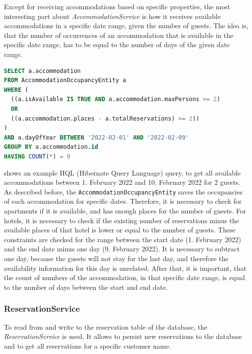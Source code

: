 Except for receiving accommodations based on specific properties, the most interesting part about \textit{AccommodationService} is how it receives available accommodations in a specific date range, given the number of guests.
The idea is, that the number of occurrences of an accommodation that is available in the specific date range, has to be equal to the number of days of the given date range.
\begin{lstlisting}[label=lst:02_design_ejb_accommodation_sql, caption=Example of a HQL query to receive all available accommodations, language=sql]
SELECT a.accommodation
FROM AccommodationOccupancyEntity a
WHERE (
  ((a.isAvailable IS TRUE AND a.accommodation.maxPersons >= 2) 
  OR 
  ((a.accommodation.places - a.totalReservations) >= 2))
)
AND a.dayOfYear BETWEEN '2022-02-01' AND '2022-02-09'
GROUP BY a.accommodation.id
HAVING COUNT(*) = 9 
\end{lstlisting}
 shows an example HQL (Hibernate Query Language) query, to get all available accommodations between 1. February 2022 and 10. February 2022 for 2 guests.
As described before, the \texttt{AccommodationOccupancyEntity} saves the occupancies of each accommodation for specific dates. Therefore, it is necessary to check for apartments if it is available, and has enough places for the number of guests. For hotels, it is necessary to check if the existing number of reservations minus the available places of that hotel is lower or equal to the number of guests.
These constraints are checked for the range between the start date (1. February 2022) and the end date minus one day (9. February 2022). It is necessary to subtract one day, because the guests will not stay for the last day, and therefore the availability information for this day is unrelated.
After that, it is important, that the count of numbers of the accommodation, in that specific date range, is equal to the number of days between the start and end date.


\subsubsection{ReservationService}\label{sec:02_design_beans_reservation}
To read from and write to the reservation table of the database, the \textit{ReservationService} is used. It allows to persist new reservations to the database and to get all reservations for a specific customer name.

